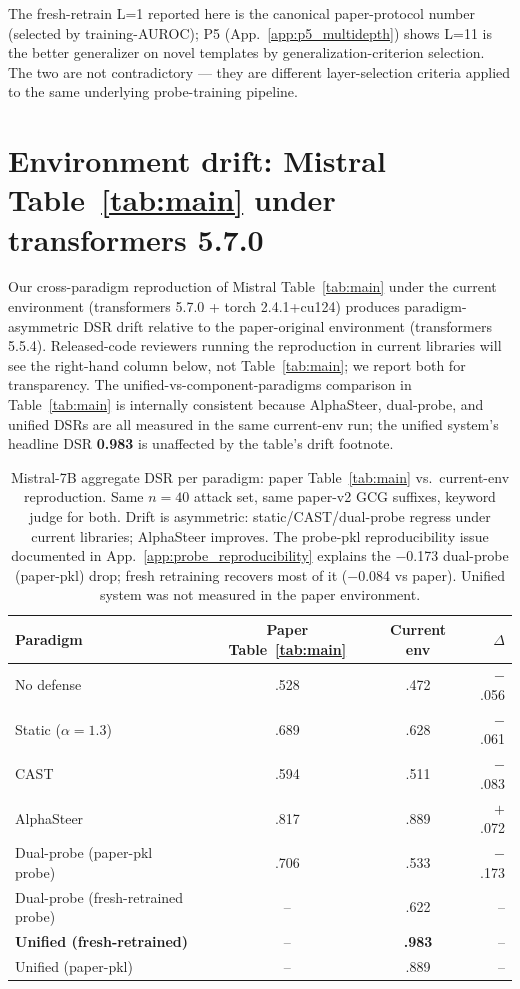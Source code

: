 \documentclass{article}
\begin{document}
The fresh-retrain L=1 reported here is the canonical paper-protocol number (selected by training-AUROC); P5 (App.~\ref{app:p5_multidepth}) shows L=11 is the better generalizer on novel templates by generalization-criterion selection. The two are not contradictory --- they are different layer-selection criteria applied to the same underlying probe-training pipeline.

\section{Environment drift: Mistral Table~\ref{tab:main} under transformers 5.7.0}
\label{app:env_drift}

Our cross-paradigm reproduction of Mistral Table~\ref{tab:main} under the current environment (transformers 5.7.0 + torch 2.4.1+cu124) produces paradigm-asymmetric DSR drift relative to the paper-original environment (transformers 5.5.4). Released-code reviewers running the reproduction in current libraries will see the right-hand column below, not Table~\ref{tab:main}; we report both for transparency. The unified-vs-component-paradigms comparison in Table~\ref{tab:main} is internally consistent because AlphaSteer, dual-probe, and unified DSRs are all measured in the same current-env run; the unified system's headline DSR \textbf{0.983} is unaffected by the table's drift footnote.

\begin{table}[H]
\centering
\small
\caption{Mistral-7B aggregate DSR per paradigm: paper Table~\ref{tab:main} vs.\ current-env reproduction. Same $n=40$ attack set, same paper-v2 GCG suffixes, keyword judge for both. Drift is asymmetric: static/CAST/dual-probe regress under current libraries; AlphaSteer improves. The probe-pkl reproducibility issue documented in App.~\ref{app:probe_reproducibility} explains the $-$0.173 dual-probe (paper-pkl) drop; fresh retraining recovers most of it ($-$0.084 vs paper). Unified system was not measured in the paper environment.}
\label{tab:env_drift}
\begin{tabular}{lccr}
\toprule
\textbf{Paradigm} & \textbf{Paper Table~\ref{tab:main}} & \textbf{Current env} & \textbf{$\Delta$} \\
\midrule
No defense                         & .528 & .472 & $-$.056 \\
Static ($\alpha=1.3$)              & .689 & .628 & $-$.061 \\
CAST                               & .594 & .511 & $-$.083 \\
AlphaSteer                         & .817 & .889 & $+$.072 \\
Dual-probe (paper-pkl probe)       & .706 & .533 & $-$.173 \\
Dual-probe (fresh-retrained probe) & -- & .622 & -- \\
\textbf{Unified (fresh-retrained)} & -- & \textbf{.983} & -- \\
Unified (paper-pkl)                & -- & .889 & -- \\
\bottomrule
\end{tabular}
\end{table}
\end{document}
